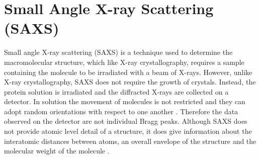 \section{Small Angle X-ray Scattering (SAXS)}
\label{sec:Small Angle X-ray Scattering}
    Small angle X-ray scattering (SAXS) is a technique used to determine the macromolecular structure, which like X-ray crystallography, requires a sample containing the molecule to be irradiated with a beam of X-rays.
    However, unlike X-ray crystallography, SAXS does not require the growth of crystals.
    Instead, the protein solution is irradiated and the diffracted X-rays are collected on a detector.
    In solution the movement of molecules is not restricted and they can adopt random orientations with respect to one another \cite{blanchet2013small}.
    Therefore the data observed on the detector are not individual Bragg peaks.
    Although SAXS does not provide atomic level detail of a structure, it does give information about the interatomic distances between atoms, an overall envelope of the structure and the molecular weight of the molecule \cite{pollack2011saxs}.

